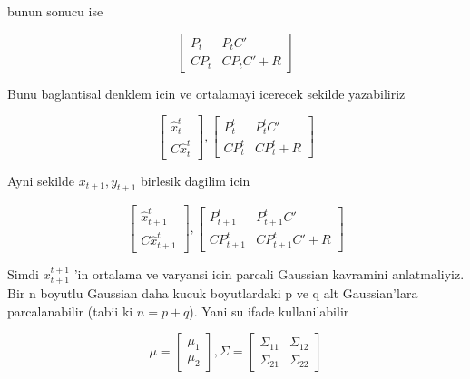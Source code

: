 \documentclass[12pt,fleqn]{article}
\begin{document}
bunun sonucu ise

\[ 
\left[\begin{array}{rr}
P_t & P_t C' \\
CP_t & CP_tC' + R
\end{array}\right]
 \]

Bunu baglantisal denklem icin ve ortalamayi icerecek sekilde yazabiliriz

\[ 
\left[\begin{array}{r}
\hat{x}_t^t \\
C\hat{x}_t^t
\end{array}\right] 
, 
\left[\begin{array}{rr}
P_t^t & P_t^tC' \\
CP_t^t & CP_t^t + R
\end{array}\right]
 \]

Ayni sekilde $x_{t+1} , y_{t+1}$ birlesik dagilim icin

\[ 
\left[\begin{array}{r}
\hat{x}_{t+1}^t \\
C\hat{x}_{t+1}^t
\end{array}\right], 
\left[\begin{array}{rr}
P_{t+1}^t & P_{t+1}^tC' \\
CP_{t+1}^t & CP_{t+1}^tC' + R
\end{array}\right]
 \]

Simdi $x_{t+1}^{t+1}$ 'in ortalama ve varyansi icin parcali Gaussian kavramini
anlatmaliyiz. Bir n boyutlu Gaussian daha kucuk boyutlardaki p ve q alt
Gaussian'lara parcalanabilir (tabii ki $n = p + q$). Yani su ifade
kullanilabilir

\[ \mu = 
\left[\begin{array}{r}
\mu_1 \\ \mu_2
\end{array}\right], 
\Sigma = 
\left[\begin{array}{rr}
\Sigma_{11} & \Sigma_{12} \\
\Sigma_{21} & \Sigma_{22} 
\end{array}\right]
 \]
\end{document}
